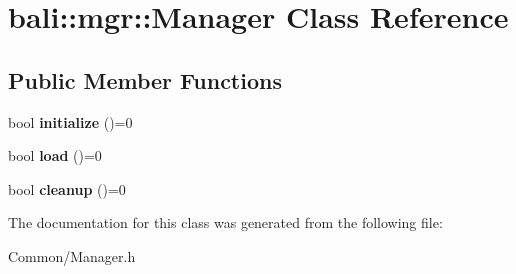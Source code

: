 \hypertarget{classbali_1_1mgr_1_1_manager}{\section{bali\-:\-:mgr\-:\-:Manager Class Reference}
\label{classbali_1_1mgr_1_1_manager}
}
\subsection*{Public Member Functions}
\begin{DoxyCompactItemize}
\item 
\hypertarget{classbali_1_1mgr_1_1_manager_a585bcec2c14946b0a1736a3bb84fb2ff}{bool {\bfseries initialize} ()=0}\label{classbali_1_1mgr_1_1_manager_a585bcec2c14946b0a1736a3bb84fb2ff}

\item 
\hypertarget{classbali_1_1mgr_1_1_manager_a069defef6c5241ea2f7ce60b43852282}{bool {\bfseries load} ()=0}\label{classbali_1_1mgr_1_1_manager_a069defef6c5241ea2f7ce60b43852282}

\item 
\hypertarget{classbali_1_1mgr_1_1_manager_ac5c12b040a85964cd2844a7e24620306}{bool {\bfseries cleanup} ()=0}\label{classbali_1_1mgr_1_1_manager_ac5c12b040a85964cd2844a7e24620306}

\end{DoxyCompactItemize}


The documentation for this class was generated from the following file\-:\begin{DoxyCompactItemize}
\item 
Common/Manager.\-h\end{DoxyCompactItemize}
